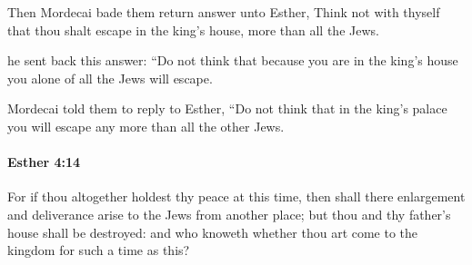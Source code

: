 			\begin{versebox}
					\item[BHS] 
					\item[LXX] 
					\item[ASV] Then Mordecai bade them return answer unto Esther, Think not with thyself that thou shalt escape in the king's house, more than all the Jews.
					\item[NIV] he sent back this answer: “Do not think that because you are in the king’s house you alone of all the Jews will escape.
					\item[NRSV] Mordecai told them to reply to Esther, “Do not think that in the king’s palace you will escape any more than all the other Jews.
			\end{versebox}

		\paragraph{Esther 4:14} %
			\label{ESTHER-4-14}

			For if thou altogether holdest thy peace at this time, then shall there enlargement and deliverance arise to the Jews from another place; but thou and thy father’s house shall be destroyed: and who knoweth whether thou art come to the kingdom for such a time as this?

